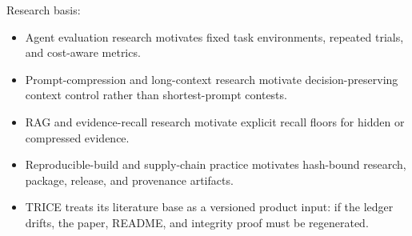 \noindent Research basis:
\begin{itemize}
\item Agent evaluation research motivates fixed task environments, repeated trials, and cost-aware metrics.
\item Prompt-compression and long-context research motivate decision-preserving context control rather than shortest-prompt contests.
\item RAG and evidence-recall research motivate explicit recall floors for hidden or compressed evidence.
\item Reproducible-build and supply-chain practice motivates hash-bound research, package, release, and provenance artifacts.
\item TRICE treats its literature base as a versioned product input: if the ledger drifts, the paper, README, and integrity proof must be regenerated.
\end{itemize}
